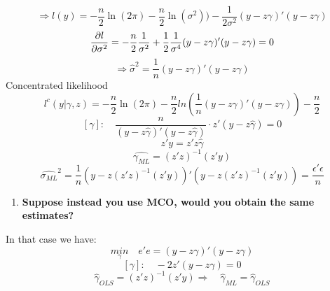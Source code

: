 \documentclass[12pt,onecolumn]{article}
\begin{document}
\begin{enumerate}
\begin{enumerate}
\begin{equation*}
            \Rightarrow l(y)={-\frac{n}{2}}\ln(2\pi)-{\frac{n}{2}}\ln(\sigma^2))-{\frac{1}{2\sigma^2}}(y-z\gamma)'(y-z\gamma)
        \end{equation*}
        \begin{equation*}
            \pdv{l}{\sigma^2}=-{\frac{n}{2}\frac{1}{\sigma^2}}+\frac{1}{2}\frac{1}{\sigma^4}(y-z\gamma)'(y-z\gamma)=0
        \end{equation*}
        \begin{equation*}
            \Rightarrow \hat{\sigma}^2=\frac{1}{n}(y-z\gamma)'(y-z\gamma)
        \end{equation*}
        Concentrated likelihood
        \begin{equation*}
            l^c(y|\gamma,z)=-\frac{n}{2}\ln(2\pi)-\frac{n}{2}ln\left(\frac{1}{n}(y-z\gamma)'(y-z\gamma)\right)-\frac{n}{2}
        \end{equation*}
        \begin{equation*}
            \left[\gamma\right]: \quad \frac{n}{(y-z\hat{\gamma})'(y-z\hat{\gamma})}\cdot{z'(y-z\hat{\gamma})}=0
        \end{equation*}
        \begin{equation*}
            z'y=z'z\hat{\gamma}
        \end{equation*}
        \begin{equation*}
            \boxed{\hat{\gamma_{ML}}=(z'z)^{-1}(z'y)}
        \end{equation*}
        \begin{equation*}
            \boxed{\hat{\sigma_{ML}}^2=\frac{1}{n}\left(y-z(z'z)^{-1}(z'y)\right)'\left(y-z(z'z)^{-1}(z'y)\right)}=\frac{\epsilon'\epsilon}{n}
        \end{equation*}
        \begin{enumerate}[resume]
            \item \bf{Suppose instead you use MCO, would you obtain the same estimates?} 
        \end{enumerate}  
        In that case we have:
        \begin{equation*}
            \underset{\gamma}{min} \quad e'e=(y-z\gamma)'(y-z\gamma)
        \end{equation*}
        \begin{equation*}
            \left[\gamma\right]: \quad -2z'(y-z\gamma)=0
        \end{equation*}
        \begin{equation*}
            \boxed{\hat{\gamma}_{OLS}=(z'z)^{-1}(z'y)} \Rightarrow \quad \hat{\gamma}_{ML}=\hat{\gamma}_{OLS}

\end{equation*}
\end{enumerate}
\end{enumerate}
\end{document}
